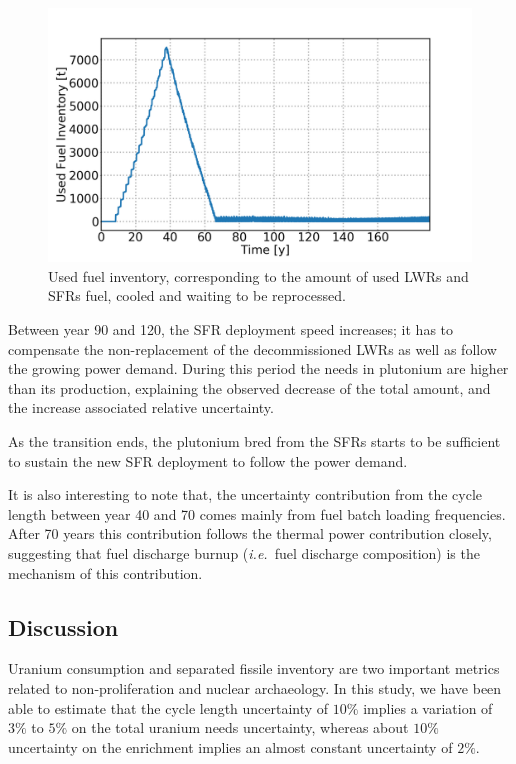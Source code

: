 \documentclass{anstrans}
\newcommand{\ie}{\emph{i.e.\ }}
\begin{document}
\begin{figure}[t] %
    \centering
    \includegraphics[scale=0.16]{used_fuel}
    \caption{Used fuel inventory, corresponding to the amount of used
    \glspl{LWR} and \glspl{SFR} fuel, cooled and waiting to be reprocessed.}
    \label{fig:used_fuel}
\end{figure}
Between year 90 and 120, the \gls{SFR} deployment speed increases; it has to
compensate the non-replacement of the decommissioned \glspl{LWR} as well as
follow the growing power demand.  During this period the needs in plutonium are higher
than its production, explaining the observed decrease of the total amount, and
the increase associated relative uncertainty.

As the transition ends, the plutonium bred from the \glspl{SFR} starts to be
sufficient to sustain the new \gls{SFR} deployment to follow the power demand.

It is also interesting to note that, the uncertainty contribution from the cycle
length between year 40 and 70 comes mainly from fuel batch loading
frequencies.  After 70 years this contribution follows the thermal
power contribution closely, suggesting that fuel discharge burnup (\ie fuel
discharge composition) is the mechanism of this contribution.

\subsection{Discussion}

Uranium consumption and separated fissile inventory are two important metrics
related to non-proliferation and nuclear archaeology.  In this study, we have
been able to estimate that the cycle length uncertainty of $10\%$ implies a
variation of $3\%$ to $5\%$ on the total uranium needs uncertainty, whereas about
$10\%$ uncertainty on the enrichment implies an almost constant uncertainty of $2\%$.
\end{document}
